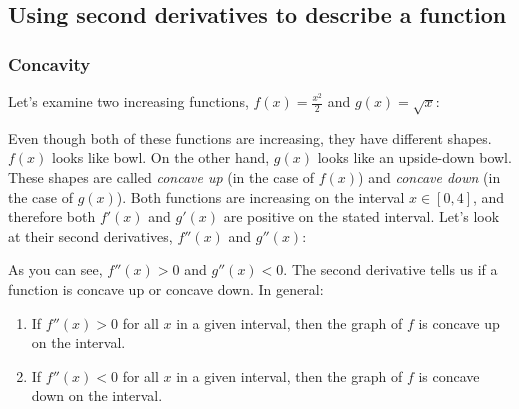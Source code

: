 \subsection{Using second derivatives to describe a function}
\subsubsection{Concavity}
Let's examine two increasing functions, $f(x) = \frac{x^2}{2}$ and $g(x) = \sqrt{x}$:
\begin{figure}
\centering
{}
\end{figure}

Even though both of these functions are increasing, they have different shapes. $f(x)$ looks like bowl. On the other hand, $g(x)$ looks like an upside-down bowl. These shapes are called \textit{concave up} (in the case of $f(x)$) and \textit{concave down} (in the case of $g(x)$). Both functions are increasing on the interval $x \in [0, 4]$, and therefore both $f'(x)$ and $g'(x)$ are positive on the stated interval. Let's look at their second derivatives, $f''(x)$ and $g''(x)$:

\begin{figure}
\centering
{}
\end{figure}

As you can see, $f''(x) >0$ and $g''(x)<0$. The second derivative tells us if a function is concave up or concave down. In general:
\begin{enumerate}
\item If $f''(x)>0$ for all $x$ in a given interval, then the graph of $f$ is concave up on the interval.
\item If $f''(x)<0$ for all $x$ in a given interval, then the graph of $f$ is concave down on the interval.
\end{enumerate}

